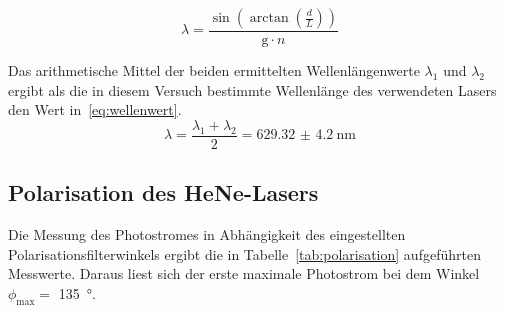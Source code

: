 \begin{equation}
\lambda = \frac{\sin{\left(\arctan{\left(\frac{d}{L}\right)}\right)}} 
{\text{g}\cdot n}
\label{eq:wellenlaenge}
\end{equation}
%

Das arithmetische Mittel der beiden ermittelten Wellenlängenwerte 	
$\lambda_1$ und $\lambda_2$ ergibt als die in diesem Versuch 
bestimmte Wellenlänge des verwendeten Lasers den Wert 
in~\eqref{eq:wellenwert}.
\begin{equation}
\lambda = \frac{\lambda_1 + \lambda_2}{2} = \SI{629.32(420)}{\nano\metre}
\label{eq:wellenwert}
\end{equation}
%
\subsection{Polarisation des HeNe-Lasers}
%

Die Messung des Photostromes in Abhängigkeit des eingestellten 
Polarisationsfilterwinkels ergibt die in 
Tabelle~\ref{tab:polarisation} aufgeführten Messwerte. Daraus liest 
sich der erste maximale Photostrom bei dem Winkel 
$\phi_\text{max} =$ \SI{135}{\degree}. 
%

